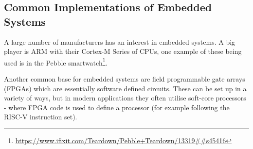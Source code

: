 \subsection{Common Implementations of Embedded Systems}\label{implementationsEmbeddedSystems}
A large number of manufacturers has an interest in embedded systems. A big player is ARM with their Cortex-M Series of CPUs, one example of these being used is in the Pebble smartwatch\footnote{\url{https://www.ifixit.com/Teardown/Pebble+Teardown/13319##s45416}}.

Another common base for embedded systems are field programmable gate arrays (FPGAs) which are essentially software defined circuits. These can be set up in a variety of ways, but in modern applications they often utilise soft-core processors - where FPGA code is used to define a processor (for example following the RISC-V instruction set).
